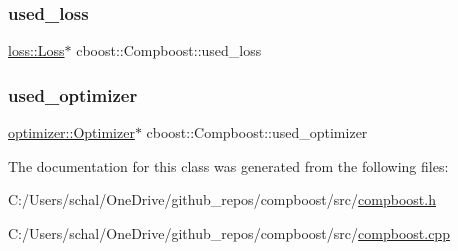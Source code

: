 \mbox{\label{classcboost_1_1_compboost_a9c776faf5e9b9e99b5241f2a650d5242}} 
\subsubsection{\texorpdfstring{used\+\_\+loss}{used\_loss}}
{\footnotesize\ttfamily \mbox{\hyperlink{classloss_1_1_loss}{loss\+::\+Loss}}$\ast$ cboost\+::\+Compboost\+::used\+\_\+loss\hspace{0.3cm}{\ttfamily [private]}}

\mbox{\label{classcboost_1_1_compboost_a6c0311a05cf6128b4c76fabbc432b807}} 
\subsubsection{\texorpdfstring{used\+\_\+optimizer}{used\_optimizer}}
{\footnotesize\ttfamily \mbox{\hyperlink{classoptimizer_1_1_optimizer}{optimizer\+::\+Optimizer}}$\ast$ cboost\+::\+Compboost\+::used\+\_\+optimizer\hspace{0.3cm}{\ttfamily [private]}}



The documentation for this class was generated from the following files\+:\begin{DoxyCompactItemize}
\item 
C\+:/\+Users/schal/\+One\+Drive/github\+\_\+repos/compboost/src/\mbox{\hyperlink{compboost_8h}{compboost.\+h}}\item 
C\+:/\+Users/schal/\+One\+Drive/github\+\_\+repos/compboost/src/\mbox{\hyperlink{compboost_8cpp}{compboost.\+cpp}}\end{DoxyCompactItemize}
